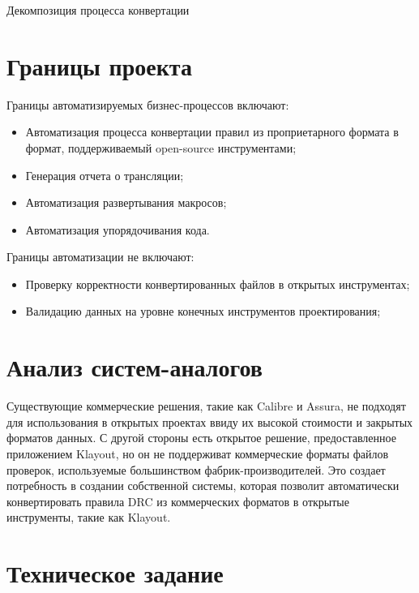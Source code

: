 \begin{image}
	\caption{Декомпозиция процесса конвертации}
	\label{fig:idef0:a4}
\end{image}

\section{Границы проекта}

Границы автоматизируемых бизнес-процессов включают:

\begin{itemize}
	\item Автоматизация процесса конвертации правил
		из проприетарного формата в формат,
		поддерживаемый open-source инструментами;
	\item Генерация отчета о трансляции;
	\item Автоматизация развертывания макросов;
	\item Автоматизация упорядочивания кода.
\end{itemize}

Границы автоматизации не включают:

\begin{itemize}
	\item Проверку корректности конвертированных файлов
		в открытых инструментах;
	\item Валидацию данных на уровне конечных инструментов проектирования;
\end{itemize}

\section{Анализ систем-аналогов}

Существующие коммерческие решения, такие как Calibre и Assura,
не подходят для использования в открытых проектах ввиду их высокой стоимости
и закрытых форматов данных.
С другой стороны есть открытое решение, предоставленное приложением Klayout,
но он не поддерживат коммерческие форматы файлов проверок,
используемые большинством фабрик-производителей.
Это создает потребность в создании собственной системы,
которая позволит автоматически конвертировать правила DRC
из коммерческих форматов в открытые инструменты, такие как Klayout.

\section{Техническое задание}

